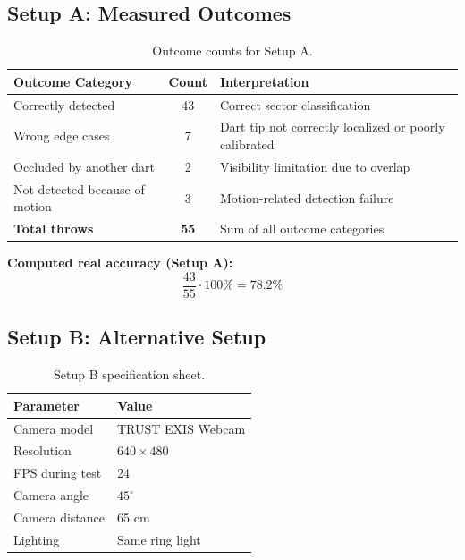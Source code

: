 \subsection{Setup A: Measured Outcomes}

\begin{table}[H]
	\centering
	\begin{tabularx}{\linewidth}{@{}X c X@{}}
		\toprule
		\textbf{Outcome Category} & \textbf{Count} & \textbf{Interpretation} \\
		\midrule
		Correctly detected & 43 & Correct sector classification \\
		Wrong edge cases & 7 & Dart tip not correctly localized or poorly calibrated \\
		Occluded by another dart & 2 & Visibility limitation due to overlap \\
		Not detected because of motion & 3 & Motion-related detection failure \\
		\midrule
		\textbf{Total throws} & \textbf{55} & Sum of all outcome categories \\
		\bottomrule
	\end{tabularx}
\caption{Outcome counts for Setup A.}
\label{tab:accuracy_setup_a_outcomes}
\end{table}

\vspace{\baselineskip}


\noindent \textbf{Computed real accuracy (Setup A):}
\[
\frac{43}{55} \cdot 100\% = 78.2\%
\]

\vspace{\baselineskip}


\subsection{Setup B: Alternative Setup}

\begin{table}[H]
	\centering
	\begin{tabularx}{\linewidth}{@{}X X@{}}
		\toprule
		\textbf{Parameter} & \textbf{Value} \\
		\midrule
		Camera model & TRUST EXIS Webcam \\
		Resolution & $640 \times 480$ \\
		FPS during test & 24 \\
		Camera angle & $45^{\circ}$ \\
		Camera distance & 65 cm \\
		Lighting & Same ring light \\
		\bottomrule
	\end{tabularx}
\caption{Setup B specification sheet.}
\label{tab:accuracy_setup_b_spec}
\end{table}

